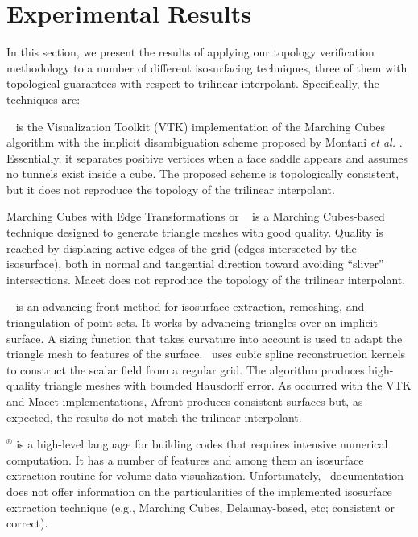 \section{Experimental Results}
\label{sec:results}

In this section, we present the results of applying our topology verification
methodology to a number of different isosurfacing techniques, 
three of them with topological guarantees with respect to trilinear interpolant.
Specifically, the techniques are:

\vtk\ \cite{vtk} is the Visualization Toolkit (VTK) implementation of the
Marching Cubes algorithm with the
implicit disambiguation scheme proposed by Montani \emph{et al.}
\cite{Montani:1994:MLT}. Essentially, it separates positive vertices when a
face saddle appears and assumes no tunnels exist inside a cube. The
proposed scheme is topologically consistent, but it does not reproduce the
topology of the trilinear interpolant. 

Marching Cubes with Edge Transformations or \macet\ \cite{Dietrich:TVCG:2008} is
a Marching Cubes-based technique designed to generate triangle 
meshes with good quality. 
Quality is reached by displacing active edges of the grid (edges intersected by the
isosurface), both in normal and tangential direction toward avoiding ``sliver'' intersections. 
Macet does not reproduce the topology of the trilinear interpolant.

\afront~\cite{Schreiner06} is an advancing-front method for isosurface
extraction, remeshing, and triangulation of point sets. It works by advancing
triangles over an implicit surface. A sizing function that takes curvature into account
is used to adapt the triangle mesh to features of the
surface. \afront\ uses cubic spline reconstruction kernels to
construct the scalar field from a regular grid.
The algorithm produces high-quality triangle meshes with bounded
Hausdorff error. As occurred with the VTK and Macet implementations, Afront produces consistent
surfaces but, as expected, the results do not match the trilinear
interpolant.

\matlab$^\circledR$ \cite{matlab10} is a high-level language for building codes that requires intensive
numerical computation. It has a number of features and among them an isosurface extraction routine for volume data
visualization. Unfortunately, \matlab\ documentation does not offer information
on the particularities of the implemented isosurface extraction technique (e.g., Marching Cubes, Delaunay-based, etc; consistent or correct).

